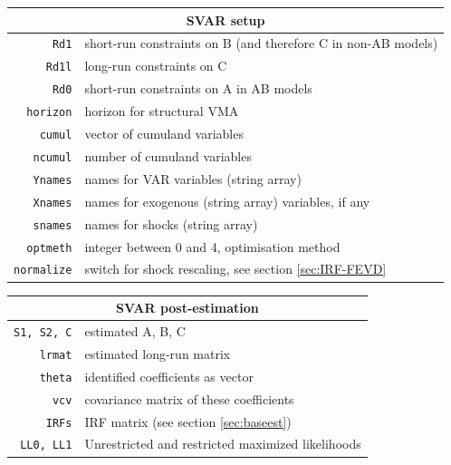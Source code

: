 \documentclass[a4paper,10pt]{article}
\begin{document}
    \begin{tabular}{rp{}}
    \hline
    \multicolumn{2}{c}{\textbf{SVAR setup}} \\
    \hline
    \texttt{Rd1}	 & short-run constraints on B (and therefore C in non-AB models) \\
    \texttt{Rd1l}	 & long-run constraints on C \\
    \texttt{Rd0}	 & short-run constraints on A in AB models \\
    \texttt{horizon}	 & horizon for structural VMA \\
    \texttt{cumul}	 & vector of cumuland variables \\
    \texttt{ncumul}	 & number of cumuland variables \\
    \texttt{Ynames}	 & names for VAR variables (string array)\\
    \texttt{Xnames}	 & names for exogenous (string array)
    variables, if any \\
    \texttt{snames}	 & names for shocks (string array) \\
    \texttt{optmeth}	 & integer between 0 and 4, optimisation method \\
    \texttt{normalize} & switch for shock rescaling, see section \ref{sec:IRF-FEVD} \\
     \end{tabular}
    
    \begin{tabular}{rp{}}
    \hline
    \multicolumn{2}{c}{\textbf{SVAR post-estimation}} \\
    \hline
    \texttt{S1, S2, C} & estimated A, B, C \\
    \texttt{lrmat} & estimated long-run matrix \\ 
    \texttt{theta} & identified coefficients as vector \\
    \texttt{vcv} & covariance matrix of these coefficients \\
    \texttt{IRFs}  & IRF matrix (see section \ref{sec:baseest})\\
    \texttt{LL0, LL1} & Unrestricted and restricted maximized likelihoods \\
     \end{tabular}
    
\end{document}

